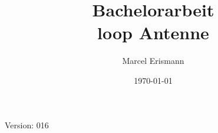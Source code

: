 \documentclass[10pt,a4paper]{article}
\author{Marcel Erismann}
\date{\today}
\title{Bachelorarbeit \\ \footnotesize{loop Antenne}}
\begin{document}
	
	Version: 016
	\tableofcontents 
	\newpage
	
\end{document}
